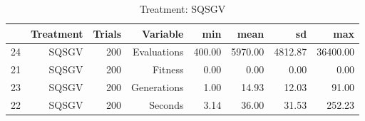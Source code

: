\begin{table}[ht]
\centering
\begin{tabular}{rrrrrrrr}
  \hline
 & Treatment & Trials & Variable & min & mean & sd & max \\ 
  \hline
24 & SQSGV & 200 & Evaluations & 400.00 & 5970.00 & 4812.87 & 36400.00 \\ 
  21 & SQSGV & 200 & Fitness & 0.00 & 0.00 & 0.00 & 0.00 \\ 
  23 & SQSGV & 200 & Generations & 1.00 & 14.93 & 12.03 & 91.00 \\ 
  22 & SQSGV & 200 & Seconds & 3.14 & 36.00 & 31.53 & 252.23 \\ 
   \hline
\end{tabular}
\caption{Treatment: SQSGV} 
\end{table}
